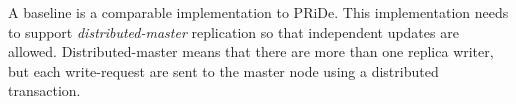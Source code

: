 A baseline is a comparable implementation to PRiDe. This implementation needs to support \emph{distributed-master} replication so that independent updates are allowed. Distributed-master means that there are more than one replica writer, but each write-request are sent to the master node using a distributed transaction. 









	

